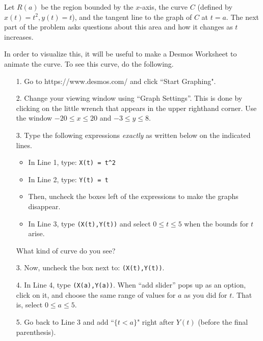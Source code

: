\documentclass{ximera}
\author{Jim Talamo}
\begin{document}
\begin{exercise}
Let $R(a)$ be the region bounded by the $x$-axis, the curve $C$ (defined by $x(t) = t^2, y(t)=t$), and the tangent line to the graph of $C$ at $t=a$.  The next part of the problem asks questions about this area and how it changes as $t$ increases.

In order to visualize this, it will be useful to make a Desmos Worksheet to animate the curve.  To see this curve, do the following.

\begin{itemize}
\item[1.] Go to https://www.desmos.com/ and click ``Start Graphing".
\item[2.] Change your viewing window using ``Graph Settings''.  This is done by clicking on the little wrench that appears in the upper righthand corner.  Use the window $-20\leq x \leq 20$ and $-3 \leq y \leq 8$.
\item[3.] Type the following expressions \emph{exactly} as written below on the indicated lines.
\begin{itemize}
\item In Line 1, type: \verb|X(t) = t^2|  
\item In Line 2, type: \verb|Y(t) = t|
\item Then, uncheck the boxes left of the expressions to make the graphs disappear.
\item In Line 3, type \verb|(X(t),Y(t))| and select $0\leq t \leq 5$ when the bounds for $t$ arise.  
\end{itemize}
What kind of curve do you see?

\begin{multipleChoice}
\end{multipleChoice}

\item[3.] Now, uncheck the box next to: \verb|(X(t),Y(t))|.
\item[4.] In Line 4, type \verb|(X(a),Y(a))|.  When ``add slider'' pops up as an option, click on it, and choose the same range of values for $a$ as you did for $t$.  That is, select $0 \leq a \leq 5$.
\item[5.] Go back to Line 3 and add ``$\{t<a\}$" right after $Y(t)$ (before the final parenthesis).  


\end{itemize}
\end{exercise}
\end{document}
